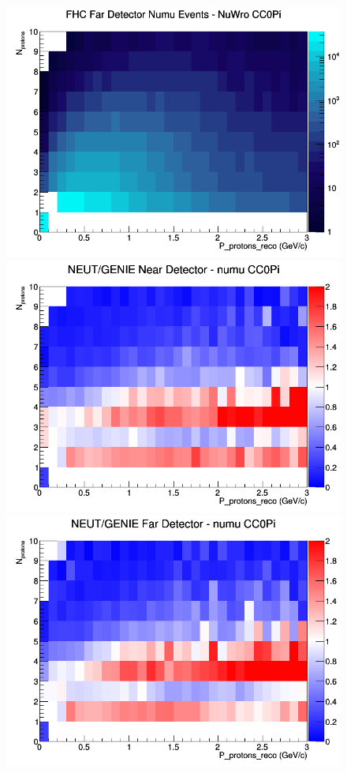 \documentclass[12pt]{article}
\begin{document}
\begin{figure}[h]
\endminipage
{}
\includegraphics[width=\linewidth]{eff_N_P/LAr/protons/CC0Pi_FHC_FD_numu_N_P_NuWro.png}
\endminipage
\newline
{}
\includegraphics[width=\linewidth]{eff_N_P/LAr/protons/ratios/CC0Pi_NEUT_GENIE_numu_near_N_P.png}
\endminipage
{}
\includegraphics[width=\linewidth]{eff_N_P/LAr/protons/ratios/CC0Pi_NEUT_GENIE_numu_far_N_P.png}

\end{figure}
\end{document}
